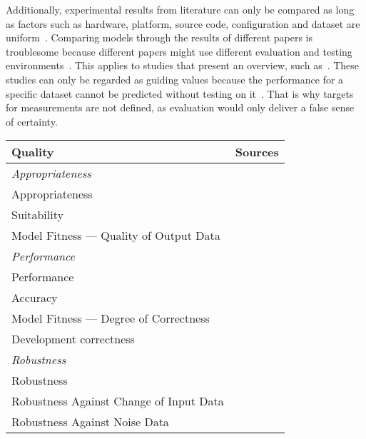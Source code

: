 Additionally, experimental results from literature can only be compared as long as factors such as
hardware, platform, source code, configuration and dataset are uniform~\citep{arpteg_software_2018}.
Comparing models through the results of different papers is troublesome because different papers
might use different evaluation and testing environments~\citep{baek_what_2019}.
This applies to studies that present an overview, such as~\cite{chen_text_2021,long_scene_2021}.
These studies can only be regarded as guiding values because the performance for a specific dataset
cannot be predicted without testing on it~\citep{arpteg_software_2018}.
That is why targets for measurements are not defined, as evaluation would only deliver a false
sense of certainty.

\begin{table}[h]
    \centering\scriptsize
    \begin{tabular}{p{} p{}}
        \textbf{Quality} & \textbf{Sources} \\
        \toprule
        \textit{Appropriateness} \\
        Appropriateness &~\cite{siebert_construction_2021} \\
        Suitability &~\cite{siebert_construction_2021} \\
        Model Fitness --- Quality of Output Data &~\cite{nakamichi_requirements-driven_2020} \\
        \midrule
        \textit{Performance} \\
        Performance &~\cite{ashmore_assuring_2021,vogelsang_requirements_2019} \\
        Accuracy &~\cite{nakamichi_requirements-driven_2020} \\
        Model Fitness --- Degree of Correctness &~\cite{nakamichi_requirements-driven_2020,
                                                    zhang_machine_2020} \\
        Development correctness &~\cite{siebert_construction_2021} \\
        \midrule
        \textit{Robustness} \\
        Robustness &~\cite{ashmore_assuring_2021, hu_towards_2020, siebert_construction_2021} \\
        Robustness Against Change of Input Data &~\cite{nakamichi_requirements-driven_2020} \\
        Robustness Against Noise Data &~\cite{nakamichi_requirements-driven_2020} \\

\end{tabular}
\end{table}
